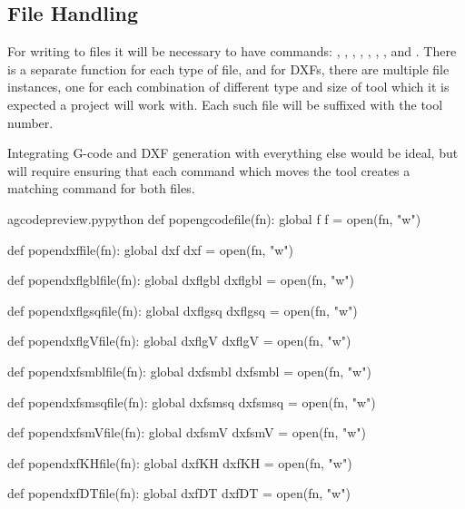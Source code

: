 \documentclass{ltxdoc}
\begin{document}
\begin{samepage}
\subsection{File Handling}
 
For writing to files it will be necessary to have commands: 
, 
, 
, 
, 
, 
,  
, and 
.
There is a separate function for each type of file, and for DXFs, there are multiple file
instances, one for each combination of different type and size of tool which it is expected 
a project will work with. Each such file will be suffixed with the tool number.

Integrating G-code and DXF generation with everything else would be ideal, but will require 
ensuring that each command which moves the tool creates a matching command for both files.

\lstset{firstnumber=\thegcpy}
\begin{writecode}{a}{gcodepreview.py}{python}
def popengcodefile(fn):
    global f
    f = open(fn, "w")

def popendxffile(fn):
    global dxf
    dxf = open(fn, "w")

def popendxflgblfile(fn):
    global dxflgbl
    dxflgbl = open(fn, "w")

def popendxflgsqfile(fn):
    global dxflgsq
    dxflgsq = open(fn, "w")

def popendxflgVfile(fn):
    global dxflgV
    dxflgV = open(fn, "w")

def popendxfsmblfile(fn):
    global dxfsmbl
    dxfsmbl = open(fn, "w")

def popendxfsmsqfile(fn):
    global dxfsmsq
    dxfsmsq = open(fn, "w")

def popendxfsmVfile(fn):
    global dxfsmV
    dxfsmV = open(fn, "w")

def popendxfKHfile(fn):
    global dxfKH
    dxfKH = open(fn, "w")

def popendxfDTfile(fn):
    global dxfDT
    dxfDT = open(fn, "w")

\end{writecode}
\addtocounter{gcpy}{40}
\end{samepage}
\end{document}
